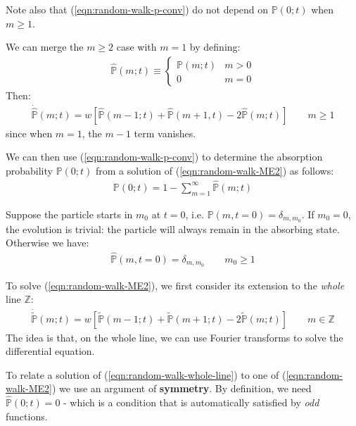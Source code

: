 \documentclass[../../main.tex]{subfiles}
\begin{document}
\medskip

Note also that (\ref{eqn:random-walk-p-conv}) do not depend on $\mathbb{P}(0;t)$ when $m \geq 1$. 

\medskip

We can merge the $m \geq 2$ case with $m=1$ by defining:
\begin{align*}
    \hat{\mathbb{P}}(m;t) \equiv \begin{cases}
        \mathbb{P}(m;t) & m > 0\\
        0 & m = 0
    \end{cases}
\end{align*}
Then:
\begin{align}\label{eqn:random-walk-ME2}
    \dot{\hat{\mathbb{P}}}(m;t) = w [\hat{\mathbb{P}}(m-1;t) + \hat{\mathbb{P}}(m+1,t) - 2\hat{\mathbb{P}}(m;t)] \qquad m\geq 1
\end{align}
since when $m = 1$, the $m-1$ term vanishes.

\medskip

We can then use (\ref{eqn:random-walk-p-conv}) to determine the absorption probability $\mathbb{P}(0;t)$ from a solution of (\ref{eqn:random-walk-ME2}) as follows:
\begin{align}\label{eqn:random-walk-pzero}
    \mathbb{P}(0;t) = 1 - \sum_{m=1}^\infty \hat{\mathbb{P}}(m;t) 
\end{align}

Suppose the particle starts in $m_0$ at $t=0$, i.e. $\mathbb{P}(m,t=0) = \delta_{m,m_0}$. If $m_0 = 0$, the evolution is trivial: the particle will always remain in the absorbing state. Otherwise we have:
\begin{align*}
    \hat{\mathbb{P}}(m,t=0) = \delta_{m,m_0} \qquad m_0 \geq 1
\end{align*}

To solve (\ref{eqn:random-walk-ME2}), we first consider its extension to the \textit{whole} line $\mathbb{Z}$:
\begin{align}\label{eqn:random-walk-whole-line}
    \dot{\tilde{\mathbb{P}}}(m;t) = w[\tilde{\mathbb{P}}(m-1;t) + \tilde{\mathbb{P}}(m+1;t) - 2 \tilde{\mathbb{P}}(m;t)] \qquad m \in \mathbb{Z}
\end{align} 
The idea is that, on the whole line, we can use Fourier transforms to solve the differential equation.

To relate a solution of (\ref{eqn:random-walk-whole-line}) to one of (\ref{eqn:random-walk-ME2}) we use an argument of \textbf{symmetry}. By definition, we need $\hat{\mathbb{P}}(0;t) = 0$ - which is a condition that is automatically satisfied by \textit{odd} functions. 
\end{document}
